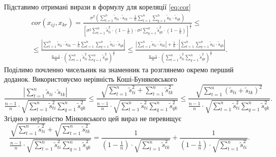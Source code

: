Підставимо отримані вирази в формулу для кореляції \eqref{eq:cor}
\begin{equation}\label{eq:corto}
  \begin{gathered}
    cor \left( x_{ij}, x_{kr} \right) =
    \frac{\sigma^2 \left( \sum \limits_{t=1}^n \tilde{s}_{ti} \cdot \tilde{s}_{tk} - \frac{1}{n} \sum \limits_{t=1}^n \sum \limits_{q=1}^n \tilde{s}_{ti} \cdot \tilde{s}_{qk} \right) }{\left[ \sigma^2 \sum \limits_{t=1}^n \tilde{s}_{ti}^2 \cdot \left( 1 - \frac{1}{n}\right) \cdot \sigma^2 \sum \limits_{q=1}^n \tilde{s}_{qk}^2 \cdot \left( 1 - \frac{1}{n} \right)\right]^{\frac{1}{2}}} \leq \\
    \leq \frac{\left| \sum \limits_{t=1}^n \tilde{s}_{ti} \cdot \tilde{s}_{tk} - \frac{1}{n} \sum \limits_{t=1}^n \sum \limits_{q=1}^n \tilde{s}_{ti} \cdot \tilde{s}_{qk} \right|}{ \frac{n-1}{n} \cdot \left( \sum \limits_{t=1}^n \tilde{s}_{ti}^2 \sum \limits_{q=1}^n \tilde{s}_{qk}^2\right)^{\frac{1}{2}}} \leq
    \frac{\left| \sum \limits_{t=1}^n \tilde{s}_{ti} \cdot \tilde{s}_{tk}\right|+ \frac{1}{n} \cdot \left| \sum \limits_{t=1}^n \sum \limits_{q=1}^n \tilde{s}_{ti} \cdot \tilde{s}_{qk}\right|}{\frac{n-1}{n} \cdot \left(\sum \limits_{t=1}^n \tilde{s}_{ti}^2 \sum \limits_{q=1}^n \tilde{s}_{qk}^2\right)^{\frac{1}{2}}}.
  \end{gathered}
\end{equation}
Поділимо почленно чисельник на знаменник та розглянемо окремо перший доданок.
Використовуємо нерівність Коші-Буняковського \cite{DorogovtsevMA}
\begin{equation*}
  \frac{\left| \sum \limits_{t=1}^n \tilde{s}_{ti} \cdot \tilde{s}_{tk}\right|}{\frac{n-1}{n} \cdot \sqrt{\sum \limits_{t=1}^n \tilde{s}_{ti}^2 \sum \limits_{q=1}^n \tilde{s}_{qk}^2}} \leq
  \frac{\sqrt{\sum \limits_{t=1}^n \tilde{s}_{ti}^2 + \sum \limits_{t=1}^n \tilde{s}_{tk}^2}}{\frac{n-1}{n} \cdot \sqrt{\sum \limits_{t=1}^n \tilde{s}_{ti}^2 \sum \limits_{q=1}^n \tilde{s}_{qk}^2}}\leq
  \frac{\sqrt{\sum \limits_{t=1}^n \left( \tilde{s}_{ti} + \tilde{s}_{tk} \right)^2}}{\frac{n-1}{n} \cdot \sqrt{\sum \limits_{t=1}^n \tilde{s}_{ti}^2 \sum \limits_{q=1}^n \tilde{s}_{qk}^2}}.
\end{equation*}
Згідно з нерівністю Мінковського \cite{DorogovtsevMA} цей вираз не перевищує
\begin{equation*}
  \frac{\sqrt{\sum \limits_{t=1}^n \tilde{s}_{ti}^2} + \sqrt{\sum \limits_{t=1}^n \tilde{s}_{tk}^2}}{\frac{n-1}{n} \cdot \sqrt{\sum \limits_{t=1}^n \tilde{s}_{ti}^2 \sum \limits_{q=1}^n \tilde{s}_{qk}^2}} =
  \frac{1}{\left( 1 - \frac{1}{n}\right) \cdot \sqrt{\sum \limits_{t=1}^n \tilde{s}_{tk}^2}} + \frac{1}{\left( 1 - \frac{1}{n} \right) \cdot \sqrt{\sum \limits_{t=1}^n \tilde{s}_{ti}^2}}.
\end{equation*}

